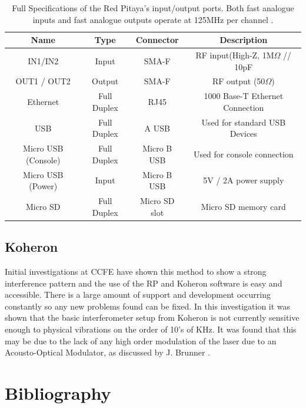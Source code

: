 \documentclass[12pt,a4paper,oneside]{report}
\begin{document}
\begin{table}[H]
	\setlength\arrayrulewidth{1pt}
    \begin{tabular}{ c c c c } 
        Name & Type & Connector & Description\\
        \hline
        IN1/IN2 & Input & SMA-F & RF input(High-Z, 1M$\Omega$ // 10pF\\[1pt]
        OUT1 / OUT2 & Output & SMA-F & RF output (50$\Omega$)\\[1pt]
        Ethernet & Full Duplex & RJ45 & 1000 Base-T Ethernet Connection\\[1pt]
        USB & Full Duplex & A USB & Used for standard USB Devices\\[1pt]
        Micro USB (Console) & Full Duplex & Micro B USB & Used for console connection\\[1pt]
        Micro USB (Power) & Input & Micro B USB & 5V / 2A power supply\\[1pt]
        Micro SD & Full Duplex & Micro SD slot & Micro SD memory card\\
    \end{tabular}
    \caption{Full Specifications of the Red Pitaya's input/output ports. Both fast analogue inputs and fast analogue outputs operate at 125MHz per channel \cite[p.~7]{Leban2014RedManual}.}
    \label{RPspec}
\end{table}

\section{Koheron}
Initial investigations at CCFE \cite{Hickling2017InvestigationMAST-U} have shown this method to show a strong interference pattern and the use of the RP and Koheron software is easy and accessible. There is a large amount of support and development occurring constantly so any new problems found can be fixed. In this investigation it was shown that the basic interferometer setup from Koheron is not currently sensitive enough to physical vibrations on the order of 10's of KHz. It was found that this may be due to the lack of any high order modulation of the laser due to an Acousto-Optical Modulator, as discussed by J. Brunner \cite[p. ~29]{Brunner2017}.

\pagebreak
\chapter{Bibliography}
	\printbibliography[heading=none]

\pagebreak


\setcounter{page}{2}
\begin{appendices}

%
\end{appendices}
\end{document}
